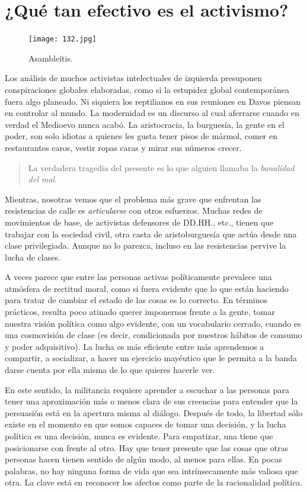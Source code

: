 \section{¿Qué tan efectivo es el activismo?}
\label{sec:activismo}

\begin{figure}[htbp]
	\centering
	\texttt{[image: 132.jpg]}
	\caption{Asambleítis.}
	\label{fig:132}
\end{figure}

Los análisis de muchos activistas intelectuales de izquierda presuponen conspiraciones globales elaboradas, como si la estupidez global contemporánea fuera algo planeado. Ni siquiera los reptilianos en sus reuniones en Davos piensan en controlar al mundo. La modernidad es un discurso al cual aferrarse cuando en verdad el Medioevo nunca acabó. La aristocracia, la burguesía, la gente en el poder, son solo idiotas a quienes les gusta tener pisos de mármol, comer en restaurantes caros, vestir ropas caras y mirar sus números crecer.

\begin{quote}
	La verdadera tragedia del presente es lo que alguien llamaba la \emph{banalidad del mal}.\addref{}
\end{quote}

Mientras, nosotras vemos que el problema más grave que enfrentan las resistencias de calle es \emph{articularse} con otros esfuerzos. Muchas redes de movimientos de base, de activistas defensores de DD.HH., etc., tienen que trabajar con la sociedad civil, otra casta de aristoburguesía que actúa desde una clase privilegiada. Aunque no lo parezca, incluso en las resistencias pervive la lucha de clases.

A veces parece que entre las personas activas políticamente prevalece una atmósfera de rectitud moral, como si fuera evidente que lo que están haciendo para tratar de cambiar el estado de las cosas es lo correcto. En términos prácticos, resulta poco atinado querer imponernos frente a la gente, tomar nuestra visión política como algo evidente, con un vocabulario cerrado, cuando es una cosmovisión de clase (es decir, condicionada por nuestros hábitos de consumo y poder adquisitivo). La lucha es más eficiente entre más aprendemos a compartir, a socializar, a hacer un ejercicio mayéutico que le permita a la banda darse cuenta por ella misma de lo que quieres hacerle ver.

En este sentido, la militancia requiere aprender a escuchar a las personas para tener una aproximación más o menos clara de sus creencias para entender que la persuasión está en la apertura misma al diálogo. Después de todo, la libertad sólo existe en el momento en que somos capaces de tomar una decisión, y la lucha política es una decisión, nunca es evidente. Para empatizar, una tiene que posicionarse con  frente al otro. Hay que tener presente que las cosas que otras personas hacen tienen sentido de algún modo, al menos para ellas. En pocas palabras, no hay ninguna forma de vida que sea intrínsecamente más valiosa que otra. La clave está en reconocer los afectos como parte de la racionalidad política.

